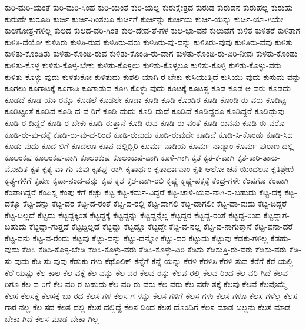 {ಕುರಿ-ಮರಿ-ಯಂತೆ
ಕುರಿ-ಮರಿ-ಸಿಂಹ
ಕುರಿ-ಯಂತೆ
ಕುರಿ-ಯಲ್ಲ
ಕುರುಕ್ಷೇತ್ರದ
ಕುರುಡ
ಕುರುಡನ
ಕುರುಹಲ್ಲ
ಕುರುಹು
ಕುರುಹೇ
ಕುರೂಪಿ
ಕುರ್ಚಿ
ಕುರ್ಚಿ-ಗಿಂತಲೂ
ಕುರ್ಚಿಗೆ
ಕುರ್ಚಿನ್ನು
ಕುರ್ಚಿಯ
ಕುರ್ಚಿ-ಯನ್ನು
ಕುರ್ಚಿ-ಯಾ-ಗಿಯೇ
ಕುಲಗೋತ್ರ-ಗಳಿಲ್ಲ
ಕುಲದ
ಕುಲದ-ವರಿ-ಗಿಂತ
ಕುಲ-ದೇವ-ತೆ-ಗಳ
ಕುಲ-ಭಾ-ವನೆ
ಕುಲುವೆಗೆ
ಕುಳಿತ
ಕುಳಿತರೆ
ಕುಳಿತಾಗ
ಕುಳಿತಿ-ದೆಯೋ
ಕುಳಿತಿರು
ಕುಳಿತಿ-ರುವ
ಕುಳಿತಿರು-ವರು
ಕುಳಿತಿರು-ವು-ದನ್ನು
ಕುಳಿತಿರು-ವುವು
ಕುಳಿತಿರು-ವೆವು
ಕುಳಿತು
ಕುಳಿತು-ಕೊಂಡಿತು
ಕುಳಿತು-ಕೊಂಡಿ-ರುವ
ಕುಳಿತು-ಕೊಂಡಿ-ರು-ವಾಗ
ಕುಳಿತು-ಕೊಂಡಿ-ರು-ವಿರಿ-ನೀವು
ಕುಳಿತು-ಕೊಂಡು
ಕುಳಿತು-ಕೊಳ್ಳ
ಕುಳಿತು-ಕೊಳ್ಳ-ಬೇಕು
ಕುಳಿತು-ಕೊಳ್ಳಲು
ಕುಳಿತು-ಕೊಳ್ಳಲೂ
ಕುಳಿತು-ಕೊಳ್ಳಿ
ಕುಳಿತು-ಕೊಳ್ಳು-ವರು
ಕುಳಿತು-ಕೊಳ್ಳು-ವುದು
ಕುಳಿತುಕೋ
ಕುಳಿತುದು
ಕುಶಲಿ-ಯಾಗಿ-ರ-ಬೇಕು
ಕುಸಿಯುತ್ತಿದೆ
ಕುಸಿಯು-ವುದು
ಕುಸುಮ-ವನ್ನು
ಕೂಗಲು
ಕೂಗಾಟಕ್ಕೆ
ಕೂಗಾಡಿ
ಕೂಗಾಡುವ
ಕೂಗಿ-ಕೊಳ್ಳು-ವುದು
ಕೂಟಕ್ಕೆ
ಕೂಟಸ್ಥ
ಕೂಡ
ಕೂಡ-ಅ-ವರು
ಕೂಡದು
ಕೂಡದೆ
ಕೂಡ-ಯಾ-ರನ್ನೂ
ಕೂಡಲೆ
ಕೂಡಲೇ
ಕೂಡಾ
ಕೂಡಿ
ಕೂಡಿ-ಕೊಂಡಿರ
ಕೂಡಿ-ಕೊಂಡಿ-ರು-ವರು
ಕೂಡಿಟ್ಟ
ಕೂಡಿಟ್ಟಂತೆ
ಕೂಡಿದ
ಕೂಡಿ-ದ-ವ-ರಿಗೆ
ಕೂಡಿ-ದುದು
ಕೂಡಿ-ದುದೆ
ಕೂಡಿದೆ
ಕೂಡಿದ್ದರೂ
ಕೂಡಿದ್ದರೆ
ಕೂಡಿದ್ದುವು
ಕೂಡಿ-ರ-ದಿದ್ದರೆ
ಕೂಡಿ-ರ-ಬೇಕು
ಕೂಡಿ-ರುತ್ತಾನೆ
ಕೂಡಿ-ರುವ
ಕೂಡಿ-ರು-ವಂತೆ
ಕೂಡಿ-ರುವನು
ಕೂಡಿ-ರು-ವರೊ
ಕೂಡಿ-ರು-ವು-ದಕ್ಕೆ
ಕೂಡಿ-ರು-ವು-ದ-ರಿಂದ
ಕೂಡಿ-ರುವುದು
ಕೂಡಿ-ರುವುದೇ
ಕೂಡಿವೆ
ಕೂಡಿ-ಸಿ-ಕೊಂಡು
ಕೂಡಿ-ಸಿದ
ಕೂಡು-ವುದು
ಕೂದ-ಲಿಗೆ
ಕೂದಲೂ
ಕೂಪ-ದಲ್ಲಿದ್ದಿರಿ
ಕೂರ್ಮ-ನಾಡಿಯ
ಕೂರ್ಮ-ನಾಡ್ಯಾಂ
ಕೂರ್ಮ-ಪುರಾಣ-ದಲ್ಲಿ
ಕೂಲಂಕಷ
ಕೂಲಂಕಷ-ವಾಗಿ
ಕೂಲಂಕುಷ
ಕೂಲಂಕುಷ-ವಾಗಿ
ಕೂಳಿ-ಗಾಗಿ
ಕೃತ
ಕೃತ-ಕ-ವಾಗಿ
ಕೃತ-ಕಾರಿ-ತಾನು-ಮೋದಿತ
ಕೃತ-ಕೃತ್ಯ-ವಾ-ಗು-ವುವು
ಕೃತಘ್ನ-ರಾಗಿ
ಕೃತಾರ್ಥಂ
ಕೃತಾರ್ಥಾನಾಂ
ಕೃತಿ-ಆಲೋ-ಚನೆ-ಯಿಂದಲೂ
ಕೃತಿಶ್ರೇಣಿ
ಕೃತ್ಯ-ಗಳಿಗೆ
ಕೃಪಣ
ಕೃಪಾ-ನಂದ-ವನ್ನು
ಕೃಪೆ
ಕೃಶ
ಕೃಶ-ವಾಗಿ-ರಲಿ
ಕೃಷ್ಣ
ಕೃಷ್ಣ-ಪಕ್ಷಕ್ಕೆ
ಕೆಂದ್ರ-ಗಳೇ
ಕೆಂಪಗೊ
ಕೆಂಪಾಗಿ
ಕೆಂಪಾಗಿದ್ದರೆ
ಕೆಂಪಿಸ್ನ
ಕೆಂಪು
ಕೆಗೆ
ಕೆಚ್ಚು
ಕೆಟ್ಟ
ಕೆಟ್ಟ-ಕರ್ಮ-ವಿದ್ದರೆ
ಕೆಟ್ಟ-ಚಾಳಿ-ಯವ-ನಾಗಿ-ರ-ಬಹುದು
ಕೆಟ್ಟ-ದಕ್ಕೆ
ಕೆಟ್ಟ-ದಕ್ಕೊ
ಕೆಟ್ಟ-ದನ್ನು
ಕೆಟ್ಟ-ದರ
ಕೆಟ್ಟ-ದ-ರಂತೆ
ಕೆಟ್ಟ-ದ-ರಲ್ಲಿ
ಕೆಟ್ಟ-ದಾಗಲಿ
ಕೆಟ್ಟ-ದಾಗಲೀ
ಕೆಟ್ಟ-ದಾ-ವುದು
ಕೆಟ್ಟ-ದಿದ್ದರೆ
ಕೆಟ್ಟ-ದಿಲ್ಲದೆ
ಕೆಟ್ಟದು
ಕೆಟ್ಟದ್ದಕ್ಕಿಂತ
ಕೆಟ್ಟದ್ದಕ್ಕೆ
ಕೆಟ್ಟದ್ದನ್ನು
ಕೆಟ್ಟದ್ದನ್ನೆಲ್ಲ
ಕೆಟ್ಟದ್ದರ
ಕೆಟ್ಟದ್ದ-ರಂತೆ
ಕೆಟ್ಟದ್ದ-ರಿಂದ
ಕೆಟ್ಟದ್ದಾಗ-ಬಹುದು
ಕೆಟ್ಟದ್ದಾ-ಗುತ್ತದೆ
ಕೆಟ್ಟದ್ದಿಲ್ಲದೆ
ಕೆಟ್ಟದ್ದು
ಕೆಟ್ಟದ್ದೂ
ಕೆಟ್ಟದ್ದೇ
ಕೆಟ್ಟ-ವ-ನಲ್ಲ
ಕೆಟ್ಟ-ವ-ನಾಗುತ್ತಾನೆ
ಕೆಟ್ಟ-ವನಾ-ದರೆ
ಕೆಟ್ಟ-ವನು
ಕೆಟ್ಟ-ವ-ರೆಂದು
ಕೆಟ್ಟವು
ಕೆಟ್ಟು-ದನ್ನು
ಕೆಟ್ಟು-ದನ್ನೋ
ಕೆಟ್ಟು-ದರ
ಕೆಟ್ಟುದು
ಕೆಟ್ಟುವು
ಕೆಡಕು-ಗಳಿಲ್ಲ
ಕೆಡಹು-ವುದು
ಕೆಡಿಸಿ
ಕೆಡಿಸಿ-ಕೊಳ್ಳ-ಬೇಡಿ
ಕೆಡಿಸಿ-ಕೊಳ್ಳು-ವರು
ಕೆಡಿಸಿ-ಕೊಳ್ಳು-ವಿರಿ
ಕೆಡಿಸು
ಕೆಡಿಸುತ್ತಿ-ರು-ವರು
ಕೆಡಿಸು-ವರು
ಕೆಡಿ-ಸು-ವುದು
ಕೆಡಿ-ಸು-ವುವು
ಕೆಡುಕು-ಗಳು
ಕೆಥೊಲಿಕ್
ಕೆನ್ನೆಗೆ
ಕೆನ್ನೆ-ಯನ್ನು
ಕೆರಳಿ
ಕೆರಳಿಸಿ
ಕೆರಳಿ-ಸುವ
ಕೆರೆಗೆ
ಕೆರೆ-ಯಲ್ಲಿ
ಕೆರೆ-ಯಷ್ಟು
ಕೆಲ-ಕಾಲ
ಕೆಲ-ವಕ್ಕೆ
ಕೆಲ-ವನ್ನು
ಕೆಲ-ವರ
ಕೆಲವ-ರನ್ನು
ಕೆಲವ-ರಲ್ಲಿ
ಕೆಲವ-ರಿಂದ
ಕೆಲ-ವರಿ-ಗಿದೆ
ಕೆಲವ-ರಿಗೂ
ಕೆಲ-ವ-ರಿಗೆ
ಕೆಲ-ವರಿ-ರ-ಬಹುದು
ಕೆಲ-ವರಿ-ರು-ವರು
ಕೆಲ-ವರು
ಕೆಲ-ವರೇ-ತಕ್ಕೆ
ಕೆಲವು
ಕೆಲವೆ
ಕೆಲವೊಮ್ಮೆ
ಕೆಲಸ
ಕೆಲಸಕ್ಕೆ
ಕೆಲಸಕ್ಕೆ-ಬಾ-ರದ
ಕೆಲಸ-ಗಳ
ಕೆಲಸ-ಗ-ಳನ್ನು
ಕೆಲಸ-ಗಳಿಗೆ
ಕೆಲಸ-ಗಳು
ಕೆಲಸ-ಗಳೂ
ಕೆಲಸ-ಗಳೆಲ್ಲ
ಕೆಲಸ-ಗಾರ-ನಲ್ಲ
ಕೆಲ-ಸದ
ಕೆಲಸ-ದಲ್ಲಿ
ಕೆಲಸ-ದಲ್ಲಿದ್ದೆ
ಕೆಲಸ-ದಿಂದ
ಕೆಲಸ-ದೊಂದಿಗೆ
ಕೆಲಸ-ಮಾಡ-ಬಲ್ಲನು
ಕೆಲಸ-ಮಾಡ-ಬೇಕಾ-ಗಿದೆ
ಕೆಲಸ-ಮಾಡ-ಬೇಕಾ-ಗಿಲ್ಲ
}
